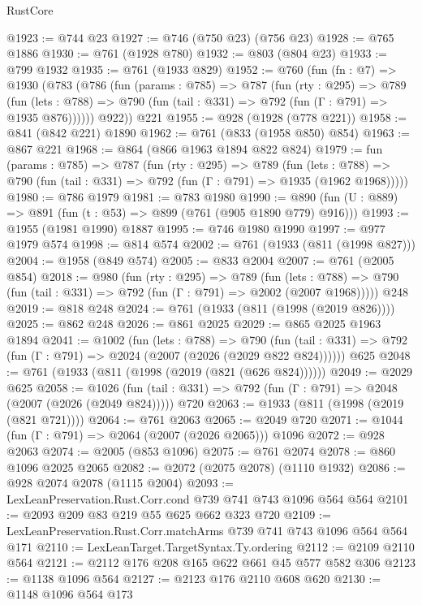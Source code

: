 \begin{lexlean}{RustCore}
\begin{coremodule}
@1923 := @744 @23
@1927 := @746 (@750 @23) (@756 @23)
@1928 := @765 @1886
@1930 := @761 (@1928 @780)
@1932 := @803 (@804 @23)
@1933 := @799 @1932
@1935 := @761 (@1933 @829)
@1952 := @760
    (fun (fn : @7) =>
    @1930
      (@783
        (@786
          (fun (params : @785) =>
          @787
            (fun (rty : @295) =>
            @789
              (fun (lets : @788) =>
              @790 (fun (tail : @331) => @792 (fun (Γ : @791) => @1935 @876))))))
        @922))
    @221
@1955 := @928 (@1928 (@778 @221))
@1958 := @841 (@842 @221) @1890
@1962 := @761 (@833 (@1958 @850) @854)
@1963 := @867 @221
@1968 := @864 (@866 @1963 @1894 @822 @824)
@1979 := fun (params : @785) =>
  @787
    (fun (rty : @295) =>
    @789
      (fun (lets : @788) =>
      @790 (fun (tail : @331) => @792 (fun (Γ : @791) => @1935 (@1962 @1968)))))
@1980 := @786 @1979
@1981 := @783 @1980
@1990 := @890 (fun (U : @889) => @891 (fun (t : @53) => @899 (@761 (@905 @1890 @779) @916)))
@1993 := @1955 (@1981 @1990) @1887
@1995 := @746 @1980 @1990
@1997 := @977 @1979 @574
@1998 := @814 @574
@2002 := @761 (@1933 (@811 (@1998 @827)))
@2004 := @1958 (@849 @574)
@2005 := @833 @2004
@2007 := @761 (@2005 @854)
@2018 := @980
    (fun (rty : @295) =>
    @789
      (fun (lets : @788) =>
      @790 (fun (tail : @331) => @792 (fun (Γ : @791) => @2002 (@2007 @1968)))))
    @248
@2019 := @818 @248
@2024 := @761 (@1933 (@811 (@1998 (@2019 @826))))
@2025 := @862 @248
@2026 := @861 @2025
@2029 := @865 @2025 @1963 @1894
@2041 := @1002
    (fun (lets : @788) =>
    @790 (fun (tail : @331) => @792 (fun (Γ : @791) => @2024 (@2007 (@2026 (@2029 @822 @824))))))
    @625
@2048 := @761 (@1933 (@811 (@1998 (@2019 (@821 (@626 @824))))))
@2049 := @2029 @625
@2058 := @1026
    (fun (tail : @331) => @792 (fun (Γ : @791) => @2048 (@2007 (@2026 (@2049 @824)))))
    @720
@2063 := @1933 (@811 (@1998 (@2019 (@821 @721))))
@2064 := @761 @2063
@2065 := @2049 @720
@2071 := @1044 (fun (Γ : @791) => @2064 (@2007 (@2026 @2065))) @1096
@2072 := @928 @2063
@2074 := @2005 (@853 @1096)
@2075 := @761 @2074
@2078 := @860 @1096 @2025 @2065
@2082 := @2072 (@2075 @2078) (@1110 @1932)
@2086 := @928 @2074 @2078 (@1115 @2004)
@2093 := LexLeanPreservation.Rust.Corr.cond @739 @741 @743 @1096 @564 @564
@2101 := @2093 @209 @83 @219 @55 @625 @662 @323 @720
@2109 := LexLeanPreservation.Rust.Corr.matchArms @739 @741 @743 @1096 @564 @564 @171
@2110 := LexLeanTarget.TargetSyntax.Ty.ordering
@2112 := @2109 @2110 @564
@2121 := @2112 @176 @208 @165 @622 @661 @45 @577 @582 @306
@2123 := @1138 @1096 @564
@2127 := @2123 @176 @2110 @608 @620
@2130 := @1148 @1096 @564 @173

\end{coremodule}
\end{lexlean}
